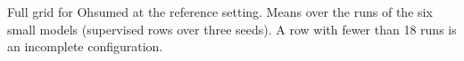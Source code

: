 \begin{table}[t]
  \centering
  \footnotesize
  
  \caption{Full grid for Ohsumed at the reference setting. Means over the runs of the six small models (supervised rows over three seeds). A row with fewer than 18 runs is an incomplete configuration.}
  \label{tab:grid_ohsumed}
\end{table}
